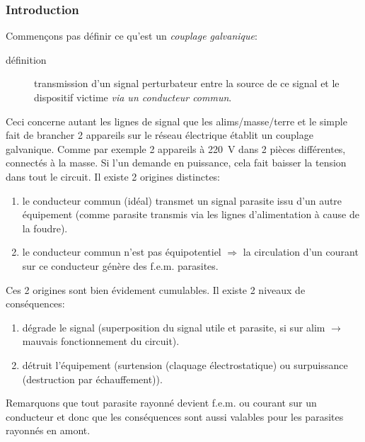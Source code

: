 \subsubsection{Introduction}
Commençons pas définir ce qu'est un \emph{couplage galvanique}:
\begin{description}
	\item[définition] transmission d'un signal perturbateur entre la source de ce signal et le dispositif victime \emph{via un conducteur commun}.
\end{description}
Ceci concerne autant les lignes de signal que les alims/masse/terre et le simple fait de brancher 2 appareils sur le réseau électrique établit un couplage galvanique. Comme par exemple 2 appareils à \SI{220}{\volt} dans 2 pièces différentes, connectés à la masse. Si l'un demande en puissance, cela fait baisser la tension dans tout le circuit. Il existe 2 origines distinctes:
\begin{enumerate}
	\item le conducteur commun (idéal) transmet un signal parasite issu d'un autre équipement (comme parasite transmis via les lignes d'alimentation à cause de la foudre).
	\item le conducteur commun n'est pas équipotentiel \(\Rightarrow\) la circulation d'un courant sur ce conducteur génère des f.e.m. parasites.
\end{enumerate}
Ces 2 origines sont bien évidement cumulables. Il existe 2 niveaux de conséquences:
\begin{enumerate}
	\item dégrade le signal (superposition du signal utile et parasite, si sur alim \(\rightarrow\) mauvais fonctionnement du circuit).
	\item détruit l'équipement (surtension (claquage électrostatique) ou surpuissance (destruction par échauffement)).
\end{enumerate}
Remarquons que tout parasite rayonné devient f.e.m. ou courant sur un conducteur et donc que les conséquences sont aussi valables pour les parasites rayonnés en amont.

